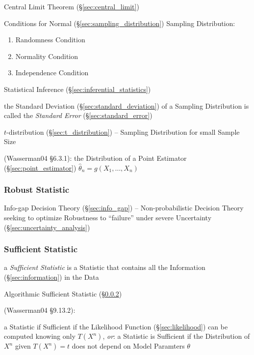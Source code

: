 \fist Central Limit Theorem (\S\ref{sec:central_limit})

Conditions for Normal (\S\ref{sec:sampling_distribution}) Sampling Distribution:
\begin{enumerate}
  \item Randomness Condition
  \item Normality Condition
  \item Independence Condition
\end{enumerate}

Statistical Inference (\S\ref{sec:inferential_statistics})

the Standard Deviation (\S\ref{sec:standard_deviation}) of a Sampling
Distribution is called the \emph{Standard Error} (\S\ref{sec:standard_error})

$t$-distribution (\S\ref{sec:t_distribution}) -- Sampling Distribution for small
Sample Size

(Wasserman04 \S6.3.1):
the Distribution of a Point Estimator (\S\ref{sec:point_estimator})
$\hat{\theta}_n = g(X_1,\ldots,X_n)$



\subsubsection{Robust Statistic}\label{sec:robust_statistic}

\fist Info-gap Decision Theory (\S\ref{sec:info_gap}) -- Non-probabilistic
Decision Theory seeking to optimize Robustness to ``failure'' under severe
Uncertainty (\S\ref{sec:uncertainty_analysis})



\subsubsection{Sufficient Statistic}\label{sec:sufficient_statistic}

a \emph{Sufficient Statistic} is a Statistic that contains all the
Information (\S\ref{sec:information}) in the Data

\fist Algorithmic Sufficient Statistic (\S\ref{sec:sufficient_statistic})

(Wasserman04 \S9.13.2):

a Statistic if Sufficient if the Likelihood Function (\S\ref{sec:likelihood})
can be computed knowing only $T(X^n)$,
\emph{or}: a Statistic is Sufficient if the Distribution of $X^n$ given
$T(X^n) = t$ does not depend on Model Paramters $\theta$

